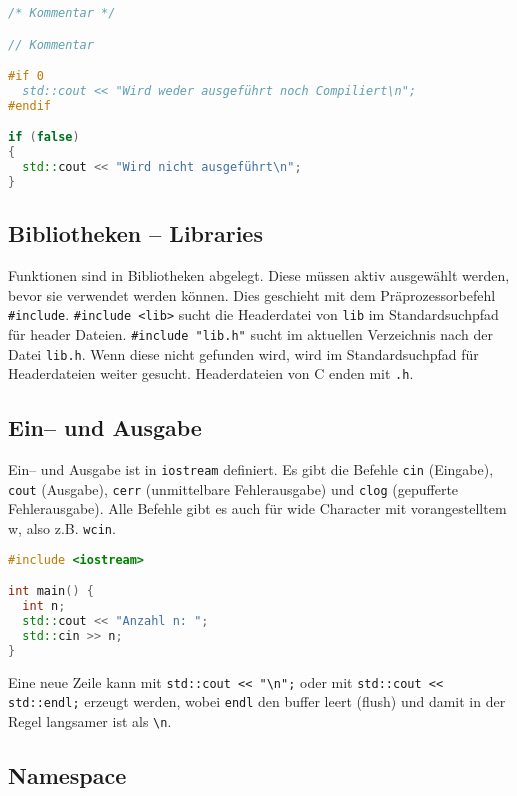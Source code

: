 \documentclass[10pt,twocolumn]{scrartcl}
\begin{document}
\begin{lstlisting}[language=C++]
/* Kommentar */

// Kommentar

#if 0
  std::cout << "Wird weder ausgeführt noch Compiliert\n";
#endif

if (false)
{
  std::cout << "Wird nicht ausgeführt\n";
}
\end{lstlisting}

\subsection{Bibliotheken -- Libraries}

Funktionen sind in Bibliotheken abgelegt. Diese müssen aktiv ausgewählt werden,
bevor sie verwendet werden können. Dies geschieht mit dem Präprozessorbefehl
\lstinline|#include|. \lstinline|#include <lib>| sucht die Headerdatei von
\lstinline|lib| im Standardsuchpfad für header Dateien.
\lstinline|#include "lib.h"| sucht im aktuellen Verzeichnis nach der Datei
\lstinline|lib.h|. Wenn diese nicht gefunden wird, wird im Standardsuchpfad für
Headerdateien weiter gesucht. Headerdateien von C enden mit \lstinline|.h|.

\subsection{Ein-- und Ausgabe}

Ein-- und Ausgabe ist in \lstinline|iostream| definiert. Es gibt die Befehle
\lstinline|cin| (Eingabe), \lstinline|cout| (Ausgabe), \lstinline|cerr|
(unmittelbare Fehlerausgabe) und \lstinline|clog| (gepufferte Fehlerausgabe).
Alle Befehle gibt es auch für wide Character mit vorangestelltem w, also z.B.
\lstinline|wcin|.

\begin{lstlisting}[language=C++]
#include <iostream>

int main() {
  int n;
  std::cout << "Anzahl n: ";
  std::cin >> n;
}
\end{lstlisting}

Eine neue Zeile kann mit \lstinline|std::cout << "\n";| oder mit
\lstinline|std::cout << std::endl;| erzeugt werden, wobei \lstinline|endl| den
buffer leert (flush) und damit in der Regel langsamer ist als \lstinline|\n|.

\subsection{Namespace}
\end{document}
